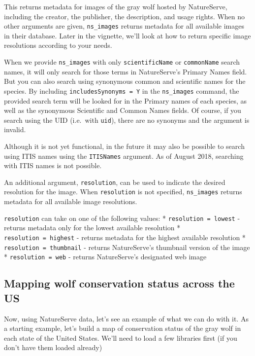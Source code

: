 \documentclass[]{article}
\begin{document}
This returns metadata for images of the gray wolf hosted by NatureServe,
including the creator, the publisher, the description, and usage rights.
When no other arguments are given, \texttt{ns\_images} returns metadata
for all available images in their database. Later in the vignette, we'll
look at how to return specific image resolutions according to your
needs.

When we provide \texttt{ns\_images} with only \texttt{scientificName} or
\texttt{commonName} search names, it will only search for those terms in
NatureServe's Primary Names field. But you can also search using
synonymous common and scientific names for the species. By including
\texttt{includesSynonyms\ =\ \textquotesingle{}Y\textquotesingle{}} in
the \texttt{ns\_images} command, the provided search term will be looked
for in the Primary names of each species, as well as the synonymous
Scientific and Common Names fields. Of course, if you search using the
UID (i.e.~with \texttt{uid}), there are no synonyms and the argument is
invalid.

Although it is not yet functional, in the future it may also be possible
to search using ITIS names using the \texttt{ITISNames} argument. As of
August 2018, searching with ITIS names is not possible.

An additional argument, \texttt{resolution}, can be used to indicate the
desired resolution for the image. When \texttt{resolution} is not
specified, \texttt{ns\_images} returns metadata for all available image
resolutions.

\texttt{resolution} can take on one of the following values: *
\texttt{resolution\ =\ \textquotesingle{}lowest\textquotesingle{}} -
returns metadata only for the lowest available resolution *
\texttt{resolution\ =\ \textquotesingle{}highest\textquotesingle{}} -
returns metadata for the highest available resolution *
\texttt{resolution\ =\ \textquotesingle{}thumbnail\textquotesingle{}} -
returns NatureServe's thumbnail version of the image *
\texttt{resolution\ =\ \textquotesingle{}web\textquotesingle{}} -
returns NatureServe's designated web image

\hypertarget{mapping-wolf-conservation-status-across-the-us}{%
\subsection{Mapping wolf conservation status across the
US}\label{mapping-wolf-conservation-status-across-the-us}}

Now, using NatureServe data, let's see an example of what we can do with
it. As a starting example, let's build a map of conservation status of
the gray wolf in each state of the United States. We'll need to load a
few libraries first (if you don't have them loaded already)
\end{document}
